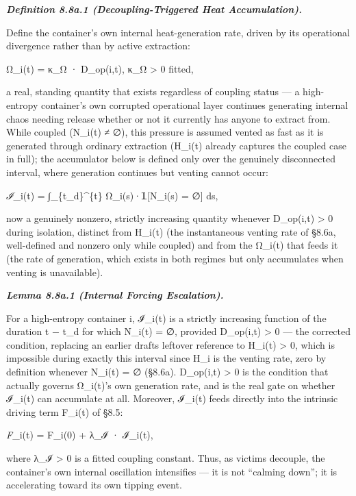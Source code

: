 \documentclass[
]{article}
\begin{document}
\emph{\textbf{Definition 8.8a.1 (Decoupling-Triggered Heat
Accumulation).}}

Define the container's own internal heat-generation rate, driven by its
operational divergence rather than by active extraction:

Ω\_i(t) = κ\_Ω · D\_op(i,t), κ\_Ω \textgreater{} 0 fitted,

a real, standing quantity that exists regardless of coupling status ---
a high-entropy container's own corrupted operational layer continues
generating internal chaos needing release whether or not it currently
has anyone to extract from. While coupled (N\_i(t) ≠ ∅), this pressure
is assumed vented as fast as it is generated through ordinary extraction
(H\_i(t) already captures the coupled case in full); the accumulator
below is defined only over the genuinely disconnected interval, where
generation continues but venting cannot occur:

\emph{ℐ}\_i(t) = ∫\_\{t\_d\}\^{}\{t\} Ω\_i(s)·𝟙{[}N\_i(s) = ∅{]} ds,

now a genuinely nonzero, strictly increasing quantity whenever
D\_op(i,t) \textgreater{} 0 during isolation, distinct from H\_i(t) (the
instantaneous venting rate of §8.6a, well-defined and nonzero only while
coupled) and from the Ω\_i(t) that feeds it (the rate of generation,
which exists in both regimes but only accumulates when venting is
unavailable).

\emph{\textbf{Lemma 8.8a.1 (Internal Forcing Escalation).}}

For a high-entropy container i, ℐ\_i(t) is a strictly increasing
function of the duration t − t\_d for which N\_i(t) = ∅, provided
D\_op(i,t) \textgreater{} 0 --- the corrected condition, replacing an
earlier drafts leftover reference to H\_i(t) \textgreater{} 0, which is
impossible during exactly this interval since H\_i is the venting rate,
zero by definition whenever N\_i(t) = ∅ (§8.6a). D\_op(i,t)
\textgreater{} 0 is the condition that actually governs Ω\_i(t)'s own
generation rate, and is the real gate on whether ℐ\_i(t) can accumulate
at all. Moreover, ℐ\_i(t) feeds directly into the intrinsic driving term
F\_i(t) of §8.5:

\emph{F}\_i(t) = F\_i(0) + λ\_ℐ · ℐ\_i(t),

where λ\_ℐ \textgreater{} 0 is a fitted coupling constant. Thus, as
victims decouple, the container's own internal oscillation intensifies
--- it is not ``calming down''; it is accelerating toward its own
tipping event.
\end{document}
